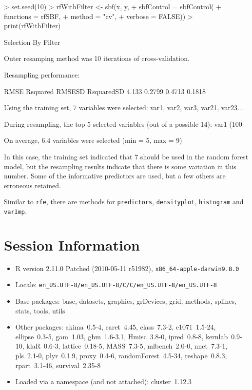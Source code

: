 \documentclass[12pt]{article}
\begin{document}
\begin{Schunk}
\begin{Sinput}
> set.seed(10)
> rfWithFilter <- sbf(x, y,
+                     sbfControl = sbfControl(
+                       functions = rfSBF,
+                       method = "cv",
+                       verbose = FALSE))
> print(rfWithFilter)
\end{Sinput}
\begin{Soutput}
Selection By Filter

Outer resamping method was 10 iterations of cross-validation. 

Resampling performance:

  RMSE Rsquared RMSESD RsquaredSD
 4.133   0.2799 0.4713     0.1818

Using the training set, 7 variables were selected:
   var1, var2, var3, var21, var23...

During resampling, the top 5 selected variables (out of a possible 14):
   var1 (100%), var3 (100%), var42 (100%), var2 (90%), var23 (60%)

On average, 6.4 variables were selected (min = 5, max = 9)
\end{Soutput}
\end{Schunk}

In this case, the training set indicated that
7 should be used in the random
forest model, but the resampling results indicate that there is some
variation in this number. Some of the informative predictors are
used, but a few others are erroneous retained.

Similar to \texttt{rfe}, there are methods for \texttt{predictors},
\texttt{densityplot}, \texttt{histogram} and \texttt{varImp}.


\section{Session Information}

\begin{itemize}\raggedright
  \item R version 2.11.0 Patched (2010-05-11 r51982), \verb|x86_64-apple-darwin9.8.0|
  \item Locale: \verb|en_US.UTF-8/en_US.UTF-8/C/C/en_US.UTF-8/en_US.UTF-8|
  \item Base packages: base, datasets, graphics, grDevices, grid,
    methods, splines, stats, tools, utils
  \item Other packages: akima~0.5-4, caret~4.45, class~7.3-2,
    e1071~1.5-24, ellipse~0.3-5, gam~1.03, gbm~1.6-3.1, Hmisc~3.8-0,
    ipred~0.8-8, kernlab~0.9-10, klaR~0.6-3, lattice~0.18-5,
    MASS~7.3-5, mlbench~2.0-0, nnet~7.3-1, pls~2.1-0, plyr~0.1.9,
    proxy~0.4-6, randomForest~4.5-34, reshape~0.8.3, rpart~3.1-46,
    survival~2.35-8
  \item Loaded via a namespace (and not attached): cluster~1.12.3
\end{itemize}
\end{document}
